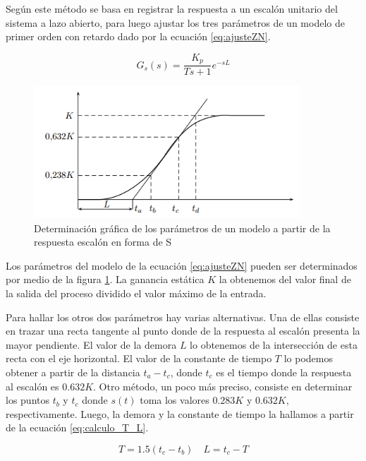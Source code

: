 \documentclass[10pt,conference,a4paper,onecolumn]{article}%
\begin{document}
Según \cite{biblia_PID} este método se basa en registrar la respuesta a un escalón
unitario del sistema a lazo abierto, para luego ajustar los tres parámetros de un modelo
de primer orden con retardo dado por la ecuación \ref{eq:ajusteZN}.

\begin{equation}
G_s(s)=\frac{K_p}{Ts+1}e^{-sL}
\label{eq:ajusteZN}
\end{equation}


\begin{figure}[h]
\centering
\includegraphics[width=10cm]{./imagenes/escalon_z-n.png}
\caption{Determinación gráfica de los parámetros de un modelo a partir de
la respuesta escalón en forma de S}
\label{fig:escalon_zn}
\end{figure}




Los parámetros del modelo de la ecuación \ref{eq:ajusteZN} pueden ser determinados por medio de la figura \ref{fig:escalon_zn}. La ganancia estática $K$ la obtenemos del valor final de la salida del proceso dividido el valor máximo de la entrada. 

Para hallar los otros dos parámetros hay varias alternativas. Una de ellas consiste en trazar una recta tangente al punto donde de la respuesta al escalón presenta la mayor pendiente. El valor de la demora $L$ lo obtenemos de la intersección de esta recta con el eje horizontal. El valor de la constante de tiempo $T$ lo podemos obtener a partir de la distancia $t_a-t_c $, donde $t_c$ es el tiempo donde la respuesta al escalón es $0.632K$.
Otro método, un poco más preciso, consiste en determinar los puntos $t_b$ y $t_c$ donde $s(t)$ toma los valores $0.283K$ y $0.632K$, respectivamente. Luego, la demora y la constante de tiempo la hallamos a partir de la ecuación \ref{eq:calculo_T_L}.

\begin{equation}
T=1.5(t_c -t_b) \quad	L=t_c-T
\label{eq:calculo_T_L}
\end{equation}
\end{document}
